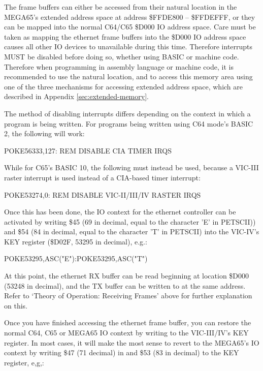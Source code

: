 The frame buffers can either be accessed from their natural location in the MEGA65's extended address space at address
\$FFDE800 -- \$FFDEFFF, or they can be mapped into the normal C64/C65 \$D000 IO address space.  Care must be
taken as mapping the ethernet frame buffers into the \$D000 IO address space causes all other IO devices to unavailable
during this time.  Therefore interrupts MUST be disabled before doing so, whether using BASIC or machine code.  Therefore
when programming in assembly language or machine code, it is recommended to use the natural location, and to access this
memory area using one of the three mechanisms for accessing extended address space, which are described in Appendix
\ref{sec:extended-memory}.

The method of
disabling interrupts differs depending on the context in which a program is being written. For programs being written using C64 mode's BASIC 2, the following will work:

\begin{screenoutput}
  POKE56333,127: REM DISABLE CIA TIMER IRQS
\end{screenoutput}

While for C65's BASIC 10, the following must instead be used, because a VIC-III raster interrupt is used instead of a CIA-based timer interrupt:

\begin{screenoutput}
POKE53274,0: REM DISABLE VIC-II/III/IV RASTER IRQS
\end{screenoutput}

Once this has been done, the IO context for the ethernet controller can be activated by writing \$45 (69 in decimal, equal to the character 'E' in PETSCII)) and \$54 (84 in decimal, equal to the character 'T' in PETSCII) into the VIC-IV's KEY register (\$D02F, 53295 in decimal), e.g.:

\begin{screenoutput}
POKE53295,ASC("E"):POKE53295,ASC("T")
\end{screenoutput}

At this point, the ethernet RX buffer can be read beginning at location \$D000 (53248 in decimal), and the TX buffer can be written to at the same address.  Refer to `Theory of Operation: Receiving Frames' above for further explanation on this.

Once you have finished accessing the ethernet frame buffer, you can restore the normal C64, C65 or MEGA65 IO context by writing to the VIC-III/IV's KEY register.  In most cases, it will make the most sense to revert to the MEGA65's IO context by writing \$47 (71 decimal) in and \$53 (83 in decimal) to the KEY register, e,g,:


